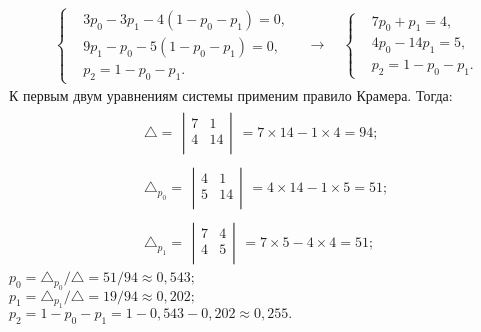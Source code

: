 \documentclass{article}
\begin{document}
\[
\begin{aligned}
    &\left\{
    \begin{aligned}
       &3p_0 - 3p_1 - 4(1 - p_0 - p_1) = 0, \\
        &9p_1 - p_0 - 5(1 - p_0 - p_1) = 0, \\
        &p_2 = 1 - p_0 - p_1.
    \end{aligned}
    \right.
    \quad \rightarrow \quad
    \left\{
    \begin{aligned}
         &7p_0 + p_1 = 4, \\
        &4p_0 - 14p_1 = 5, \\
        &p_2 = 1 - p_0 - p_1.
    \end{aligned}
    \right.
\end{aligned}
\]
\indent К первым двум уравнениям системы применим правило Крамера. Тогда:
\[
\begin{aligned}
&\triangle = 
\begin{array}{cc}
\left|\begin{array}{cc}
7 & 1 \\
4 & 14 \\
\end{array}\right|
\end{array} = 7 \times 14 - 1 \times 4 = 94; \\
&\triangle_{p_0} = 
\begin{array}{cc}
\left|\begin{array}{cc}
4 & 1 \\
5 & 14 \\
\end{array}\right|
\end{array} = 4 \times 14 - 1 \times 5 = 51; \\
&\triangle_{p_1} = 
\begin{array}{cc}
\left|\begin{array}{cc}
7 & 4 \\
4 & 5 \\
\end{array}\right|
\end{array} = 7 \times 5 - 4 \times 4 = 51;
\end{aligned}
\]
\indent 
$p_0 = \triangle_{p_0}/\triangle = 51/94 \approx 0,543;$ \\ 
\indent 
$p_1 = \triangle_{p_1}/\triangle = 19/94 \approx 0,202;$  \\ 
\indent 
$p_2 = 1 - p_0 - p_1 = 1 - 0,543 - 0,202 \approx 0,255.$ \\ \indent
\end{document}
